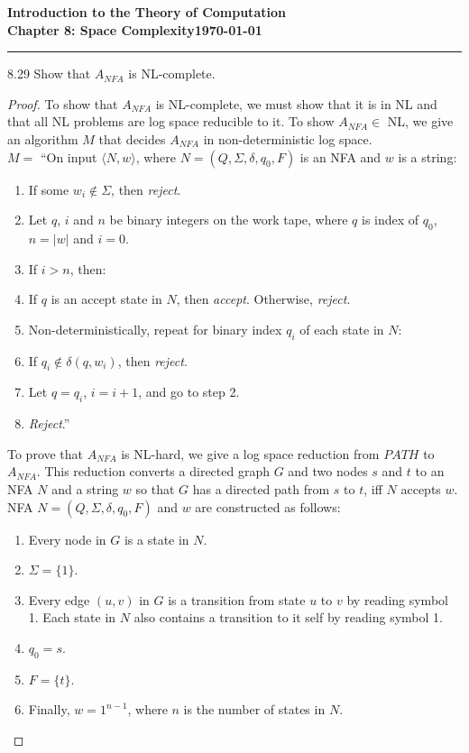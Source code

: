 \documentclass[11pt]{article}
\newcommand{\dated}{\today}
\begin{document}
\textbf{Introduction to the Theory of
Computation}\hfill\textbf{\myname}\\[0.01in]
\textbf{Chapter 8: Space Complexity}\hfill\textbf{\dated}\\
\smallskip\hrule\bigskip

\begin{problem}{8.29}
Show that $A_{NFA}$ is NL-complete.
\end{problem}

\begin{proof}
To show that $A_{NFA}$ is NL-complete, we must show that it is in NL and that all NL problems are log space reducible to it. To show $A_{NFA} \in$ NL, we give an algorithm $M$ that decides $A_{NFA}$ in non-deterministic log space. \\

$M =$ \textquotedblleft On input $\langle N, w \rangle$, where $N = (Q, \Sigma, \delta, q_0, F)$ is an NFA and $w$ is a string:
\begin{enumerate}
\item If some $w_i \notin \Sigma$, then \textit{reject}.
\item Let $q$, $i$ and $n$ be binary integers on the work tape, where $q$ is index of $q_0$, $n = |w|$ and $i = 0$.
\item If $i > n$, then:
\item \hspace*{0.5cm} If $q$ is an accept state in $N$, then \textit{accept}. Otherwise, \textit{reject}. 
\item Non-deterministically, repeat for binary index $q_i$ of each state in $N$:
\item \hspace*{0.5cm} If $q_i \notin \delta(q, w_i)$, then \textit{reject}.
\item \hspace*{0.5cm} Let $q = q_i$, $i = i + 1$, and go to step 2. 
\item \textit{Reject}.\textquotedblright
\end{enumerate}

To prove that $A_{NFA}$ is NL-hard, we give a log space reduction from $PATH$ to $A_{NFA}$. This reduction converts a directed graph $G$ and two nodes $s$ and $t$ to an NFA $N$ and a string $w$ so that $G$ has a directed path from $s$ to $t$, iff $N$ accepts $w$. NFA $N = (Q, \Sigma, \delta, q_0, F)$ and $w$ are constructed as follows:
\begin{enumerate}
\item Every node in $G$ is a state in $N$.
\item $\Sigma = \{1\}$.
\item Every edge $(u, v)$ in $G$ is a transition from state $u$ to $v$ by reading symbol 1. Each state in $N$ also contains a transition to it self by reading symbol 1.
\item $q_0 = s$.
\item $F = \{t\}$.
\item Finally, $w = 1^{n-1}$, where $n$ is the number of states in $N$.
\end{enumerate}


\end{proof}
\end{document}
